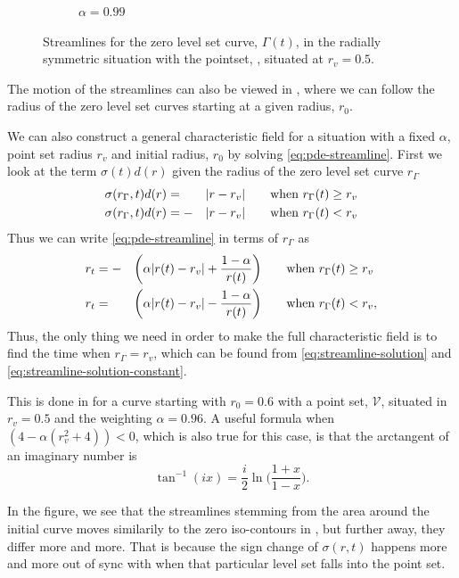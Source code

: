 \begin{figure}
\begin{subfigure}[b]{0.48\linewidth}
        \caption{$\alpha=0.99$} 
        \label{fig:radius-characteristics-99} 
    \end{subfigure} 
    \caption[Streamlines in the radially symmetric situation]{Streamlines for the zero level set curve, $\Gamma(t)$, in the radially symmetric situation with the pointset, \pointset, situated at $r_v=0.5$.}
    \label{fig:radius-characteristics}
\end{figure}

The motion of the streamlines can also be viewed in , where we can follow the radius of the zero level set curves starting at a given radius, $r_0$.

We can also construct a general characteristic field for a situation with a fixed $\alpha$, point set radius $r_v$ and initial radius, $r_0$ by solving \eqref{eq:pde-streamline}. First we look at the term $\sigma(t) d(r)$ given the radius of the zero level set curve $r_{\Gamma}$
\begin{alignat}{3}
    \sigma(r_{\Gamma}, t)d(r) &= &|r-r_v| \qquad & \text{when }r_{\Gamma}(t) \geq r_v \label{eq:sigma-radius-1}\\
    \sigma(r_{\Gamma}, t)d(r) &= -&|r-r_v| \qquad & \text{when }r_{\Gamma}(t) < r_v \label{eq:sigma-radius-2}
\end{alignat}
Thus we can write \eqref{eq:pde-streamline} in terms of $r_\Gamma$ as
\begin{alignat}{3}
    r_t &= -&\bigg(\alpha |r(t)-r_v| + \frac{1-\alpha}{r(t)}\bigg) \qquad &\text{when }r_{\Gamma}(t) \geq r_v \\
    r_t &= &\bigg(\alpha |r(t)-r_v| -  \frac{1-\alpha}{r(t)}\bigg) \qquad &\text{when }r_{\Gamma}(t) < r_v,
\end{alignat}
Thus, the only thing we need in order to make the full characteristic field is to find the time when $r_{\Gamma} = r_v$, which can be found from \eqref{eq:streamline-solution} and \eqref{eq:streamline-solution-constant}.

This is done in  for a curve starting with $r_0=0.6$ with a point set, $\mathcal{V}$, situated in $r_v=0.5$ and the weighting $\alpha = 0.96$. A useful formula when $(4-\alpha(r_v^2+4))<0$, which is also true for this case, is that the arctangent of an imaginary number is
\begin{equation*}
    \tan^{-1}(i x ) = \frac{i}{2} \ln\bigg(\frac{1+x}{1-x} \bigg).
\end{equation*}

In the figure, we see that the streamlines stemming from the area around the initial curve moves similarily to the zero iso-contours in , but further away, they differ more and more. That is because the sign change of $\sigma(r, t)$ happens more and more out of sync with when that particular level set falls into the point set. 

